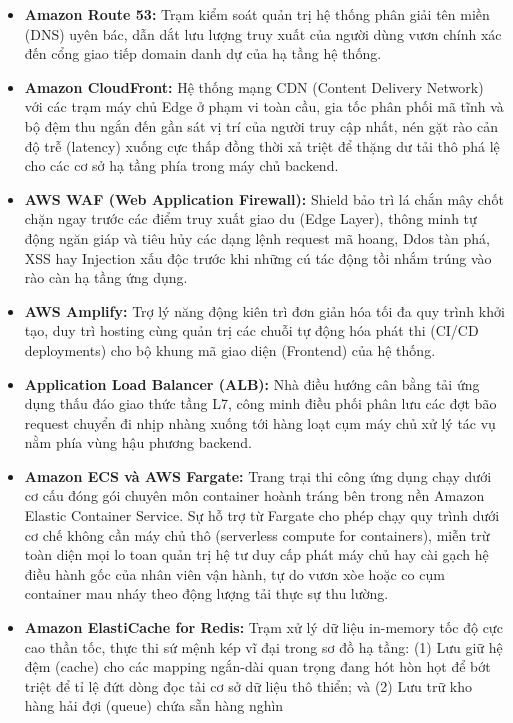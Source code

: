 \begin{itemize}
\tightlist
\item
  \textbf{Amazon Route 53:} Trạm kiểm soát quản trị hệ thống phân giải
  tên miền (DNS) uyên bác, dẫn dắt lưu lượng truy xuất của người dùng
  vươn chính xác đến cổng giao tiếp domain danh dự của hạ tầng hệ thống.
\item
  \textbf{Amazon CloudFront:} Hệ thống mạng CDN (Content Delivery
  Network) với các trạm máy chủ Edge ở phạm vi toàn cầu, gia tốc phân
  phối mã tĩnh và bộ đệm thu ngắn đến gần sát vị trí của người truy cập
  nhất, nén gặt rào cản độ trễ (latency) xuống cực thấp đồng thời xả
  triệt để thặng dư tải thô phá lệ cho các cơ sở hạ tầng phía trong máy
  chủ backend.
\item
  \textbf{AWS WAF (Web Application Firewall):} Shield bảo trì lá chắn
  mây chốt chặn ngay trước các điểm truy xuất giao du (Edge Layer),
  thông minh tự động ngăn giáp và tiêu hủy các dạng lệnh request mã
  hoang, Ddos tàn phá, XSS hay Injection xấu độc trước khi những cú tác
  động tồi nhắm trúng vào rào càn hạ tầng ứng dụng.
\item
  \textbf{AWS Amplify:} Trợ lý năng động kiên trì đơn giản hóa tối đa
  quy trình khởi tạo, duy trì hosting cùng quản trị các chuỗi tự động
  hóa phát thi (CI/CD deployments) cho bộ khung mã giao diện (Frontend)
  của hệ thống.
\item
  \textbf{Application Load Balancer (ALB):} Nhà điều hướng cân bằng tải
  ứng dụng thấu đáo giao thức tầng L7, công minh điều phối phân lưu các
  đợt bão request chuyển đi nhịp nhàng xuống tới hàng loạt cụm máy chủ
  xử lý tác vụ nằm phía vùng hậu phương backend.
\item
  \textbf{Amazon ECS và AWS Fargate:} Trang trại thi công ứng dụng chạy
  dưới cơ cấu đóng gói chuyên môn container hoành tráng bên trong nền
  Amazon Elastic Container Service. Sự hỗ trợ từ Fargate cho phép chạy
  quy trình dưới cơ chế không cần máy chủ thô (serverless compute for
  containers), miễn trừ toàn diện mọi lo toan quản trị hệ tư duy cấp
  phát máy chủ hay cài gạch hệ điều hành gốc của nhân viên vận hành, tự
  do vươn xòe hoặc co cụm container mau nháy theo động lượng tải thực sự
  thu lường.
\item
  \textbf{Amazon ElastiCache for Redis:} Trạm xử lý dữ liệu in-memory
  tốc độ cực cao thần tốc, thực thi sứ mệnh kép vĩ đại trong sơ đồ hạ
  tầng: (1) Lưu giữ hệ đệm (cache) cho các mapping ngắn-dài quan trọng
  đang hót hòn họt để bớt triệt để tỉ lệ đứt dòng đọc tải cơ sở dữ liệu
  thô thiển; và (2) Lưu trữ kho hàng hải đợi (queue) chứa sẵn hàng nghìn

\end{itemize}
